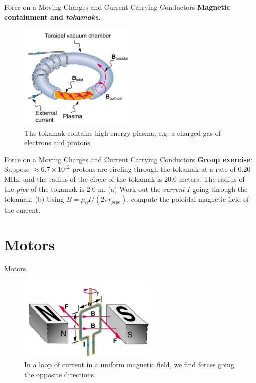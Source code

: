\documentclass{beamer}
\begin{document}
\begin{frame}{Force on a Moving Charges and Current Carrying Conductors}
\textbf{Magnetic containment and \textit{tokamaks}.}
\begin{figure}
\centering
\includegraphics[width=0.5\textwidth]{figures/tokamak.png}
\caption{\label{fig:tokamak} The tokamak contains high-energy plasma, e.g. a charged gas of electrons and protons.}
\end{figure}
\end{frame}

\begin{frame}{Force on a Moving Charges and Current Carrying Conductors}
\textbf{Group exercise}: Suppose $\approx 6.7 \times 10^{12}$ protons are circling through the tokamak at a rate of 0.20 MHz, and the radius of the circle of the tokamak is 20.0 meters.  The radius of the \textit{pipe} of the tokamak is 2.0 m. (a) Work out the \textit{current} $I$ going through the tokamak.  (b) Using $B = \mu_0 I / (2\pi r_{pipe})$, compute the poloidal magnetic field of the current.
\end{frame}

\section{Motors}

\begin{frame}{Motors} 
\begin{figure}
\centering
\includegraphics[width=0.6\textwidth]{figures/loop.png}
\caption{\label{fig:loop} In a loop of current in a uniform magnetic field, we find forces going the opposite directions.}
\end{figure}
\end{frame}
\end{document}
